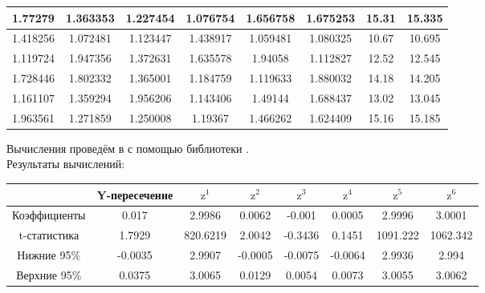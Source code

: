 \begin{center}
\begin{tabular}{ | c | c | c | c | c | c | c | c | }
      \hline 
      1.77279 & 1.363353 & 1.227454 & 1.076754 & 1.656758 & 1.675253 & 15.31 & 15.335 \\ 
      \hline 
      1.418256 & 1.072481 & 1.123447 & 1.438917 & 1.059481 & 1.080325 & 10.67 & 10.695 \\ 
      \hline 
      1.119724 & 1.947356 & 1.372631 & 1.635578 & 1.94058 & 1.112827 & 12.52 & 12.545 \\ 
      \hline 
      1.728446 & 1.802332 & 1.365001 & 1.184759 & 1.119633 & 1.880032 & 14.18 & 14.205 \\ 
      \hline 
      1.161107 & 1.359294 & 1.956206 & 1.143406 & 1.49144 & 1.688437 & 13.02 & 13.045 \\ 
      \hline 
      1.963561 & 1.271859 & 1.250008 & 1.19367 & 1.466262 & 1.624409 & 15.16 & 15.185 \\ 
      \hline 
    \end{tabular}
\end{center}

Вычисления проведём в  с помощью библиотеки .\\
Результаты вычислений:

\renewcommand{\arraystretch}{0.65}
\begin{center}
    \begin{tabular}{ | c | c | c | c | c | c | c | c | } 
      \hline
       & Y-пересечение & $\textrm{z}^1$ & $\textrm{z}^2$ & $\textrm{z}^3$ & $\textrm{z}^4$ & $\textrm{z}^5$ & $\textrm{z}^6$ \\
      \hline
      Коэффициенты & 0.017 & 2.9986 & 0.0062 & -0.001 & 0.0005 & 2.9996 & 3.0001 \\ 
      \hline 
     t-статистика & 1.7929 & 820.6219 & 2.0042 & -0.3436 & 0.1451 & 1091.222 & 1062.342 \\ 
      \hline 
     Нижние 95\% & -0.0035 & 2.9907 & -0.0005 & -0.0075 & -0.0064 & 2.9936 & 2.994 \\ 
      \hline 
     Верхние 95\% & 0.0375 & 3.0065 & 0.0129 & 0.0054 & 0.0073 & 3.0055 & 3.0062 \\ 
      \hline 
    \end{tabular}
\end{center}


